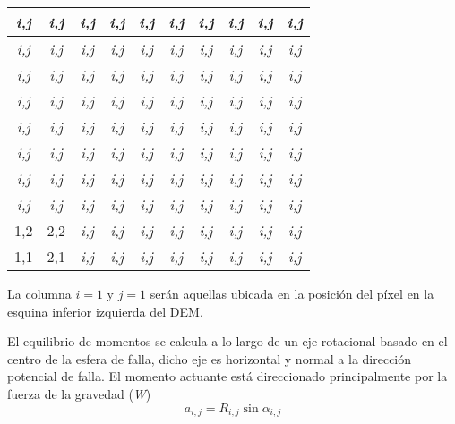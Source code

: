 \begin{center}


\begin{tabular}{|c|c|c|c|c|c|c|c|c|c|}
\hline
\textit{i,j} & \textit{i,j} & \textit{i,j} & \textit{i,j} & \textit{i,j} & \textit{i,j} & \textit{i,j} & \textit{i,j} & \textit{i,j} & \textit{i,j} \\
\hline
\textit{i,j}& \textit{i,j}& \textit{i,j} & \textit{i,j} &\textit{i,j} & \textit{i,j} & \textit{i,j} & \textit{i,j} & \textit{i,j} & \textit{i,j} \\
\hline
\textit{i,j} & \textit{i,j} & \textit{i,j} & \textit{i,j} & \textit{i,j} & \textit{i,j} & \textit{i,j} & \textit{i,j} & \textit{i,j} & \textit{i,j} \\
\hline
\textit{i,j} & \textit{i,j} & \textit{i,j} & \textit{i,j} & \textit{i,j} & \textit{i,j} & \textit{i,j} & \textit{i,j} & \textit{i,j} & \textit{i,j} \\
\hline
\textit{i,j} & \textit{i,j} & \textit{i,j} & \textit{i,j} & \textit{i,j} & \textit{i,j} & \textit{i,j} & \textit{i,j} & \textit{i,j} & \textit{i,j} \\
\hline
\textit{i,j}& \textit{i,j}& \textit{i,j}& \textit{i,j} & \textit{i,j}& \textit{i,j}& \textit{i,j} & \textit{i,j} &\textit{i,j} & \textit{i,j} \\
\hline
\textit{i,j} &\textit{i,j} & \textit{i,j} & \textit{i,j} & \textit{i,j} & \textit{i,j}& \textit{i,j}& \textit{i,j} & \textit{i,j}& \textit{i,j} \\
\hline
\textit{i,j} & \textit{i,j}& \textit{i,j}& \textit{i,j} & \textit{i,j} & \textit{i,j} & \textit{i,j} & \textit{i,j}& \textit{i,j} & \textit{i,j}\\
\hline
1,2 & 2,2 & \textit{i,j} & \textit{i,j} & \textit{i,j} & \textit{i,j}& \textit{i,j} & \textit{i,j} & \textit{i,j}& \textit{i,j}\\
\hline
1,1 & 2,1 & \textit{i,j}& \textit{i,j} & \textit{i,j} & \textit{i,j} & \textit{i,j} & \textit{i,j}& \textit{i,j} & \textit{i,j}\\
\hline
\end{tabular}
\end{center}
La columna $\textit{i}=1$ y $\textit{j}=1$ ser\'an aquellas ubicada en la posici\'on del p\'ixel en la esquina inferior izquierda del DEM.

El equilibrio de momentos se calcula a lo largo de un eje rotacional basado en el centro de la esfera de falla, dicho eje es horizontal y normal a la direcci\'on potencial de falla.
El momento actuante est\'a direccionado principalmente por la fuerza de la gravedad (\textit{W})
$$a_{i,j}=R_{i,j}\sin \alpha_{i,j}$$

